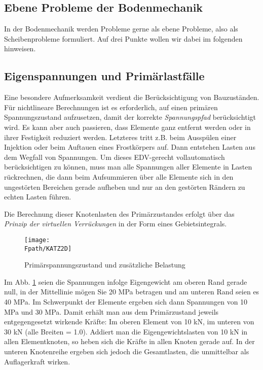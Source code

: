 {\pagebreak
{\textcolor{sectionTitleBlue}{\section{Ebene Probleme der Bodenmechanik}}
In der Bodenmechanik werden Probleme gerne als ebene Probleme, also als Scheibenprobleme
formuliert. Auf drei Punkte wollen wir dabei im folgenden hinweisen.

{\textcolor{sectionTitleBlue}{\subsection{Eigenspannungen und Prim\"{a}rlastf\"{a}lle}}}
Eine besondere Aufmerksamkeit verdient die Ber\"{u}cksichtigung von Bauzust\"{a}nden. F\"{u}r nichtlineare Berechnungen ist es erforderlich, auf einen prim\"{a}ren Spannungszustand aufzusetzen, damit der korrekte {\em Spannungspfad\/} ber\"{u}cksichtigt wird. Es kann aber auch passieren, dass Elemente ganz entfernt werden oder in ihrer Festigkeit reduziert werden. Letzteres tritt z.B. beim Aussp\"{u}len einer Injektion oder beim Auftauen eines Frostk\"{o}rpers auf. Dann entstehen Lasten aus dem Wegfall von Spannungen. Um dieses EDV-gerecht vollautomatisch ber\"{u}cksichtigen zu k\"{o}nnen, muss man alle Spannungen aller Elemente in Lasten r\"{u}ckrechnen, die dann beim Aufsummieren \"{u}ber alle Elemente sich in den ungest\"{o}rten Bereichen gerade aufheben und nur an den gest\"{o}rten R\"{a}ndern zu echten Lasten f\"{u}hren.

Die Berechnung dieser Knotenlasten des Prim\"{a}rzustandes erfolgt \"{u}ber das {\em Prinzip der virtuellen Verr\"{u}ckungen\/} in der Form eines Gebietsintegrals.

\vspace{0.2cm}
\begin{figure}[tbp] \centering
\if {} \sidecaption \fi
\texttt{[image: \\Fpath/KATZ2D]}
\caption{Prim\"{a}rspannungszustand und zus\"{a}tzliche Belastung} \label{KATZ2}
\end{figure}%

Im Abb. \ref{KATZ2} seien  die Spannungen infolge Eigengewicht am oberen Rand gerade null, in der Mittellinie m\"{o}gen Sie 20 MPa betragen und am unteren Rand seien es 40 MPa. Im Schwerpunkt der Elemente ergeben sich dann Spannungen von 10 MPa und 30 MPa. Damit erh\"{a}lt man aus dem Prim\"{a}rzustand jeweils entgegengesetzt wirkende Kr\"{a}fte: Im oberen Element von 10 kN, im unteren von 30 kN (alle Breiten = 1.0). Addiert man die Eigengewichtslasten von 10 kN in allen Elementknoten, so heben sich die Kr\"{a}fte in allen Knoten gerade auf. In der unteren Knotenreihe ergeben sich jedoch die Gesamtlasten, die unmittelbar als Auflagerkraft wirken.

}}
